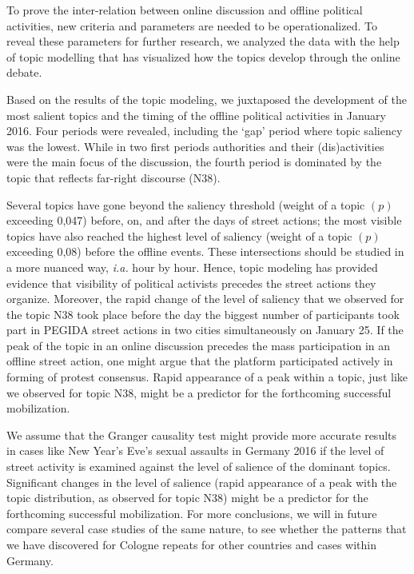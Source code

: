 To prove the inter-relation between online discussion and offline political activities, new criteria and parameters are needed to be operationalized. To reveal these parameters for further research, we analyzed the data with the help of topic modelling that has visualized how the topics develop through the online debate.

Based on the results of the topic modeling, we juxtaposed the development of the most salient topics and the timing of the offline political activities in January 2016. Four periods were revealed, including the ‘gap’ period where topic saliency was the lowest. While in two first periods authorities and their (dis)activities were the main focus of the discussion, the fourth period is dominated by the topic that reflects far-right discourse (N38).

Several topics have gone beyond the saliency threshold (weight of a topic \((p)\) exceeding 0,047) before, on, and after the days of street actions; the most visible topics have also reached the highest level of saliency (weight of a topic \((p)\) exceeding 0,08) before the offline events. These intersections should be studied in a more nuanced way, \textit{i.a.} hour by hour. Hence, topic modeling has provided evidence that visibility of political activists precedes the street actions they organize. Moreover, the rapid change of the level of saliency that we observed for the topic N38 took place before the day the biggest number of participants took part in PEGIDA street actions in two cities simultaneously on January 25. If the peak of the topic in an online discussion precedes the mass participation in an offline street action, one might argue that the platform participated actively in forming of protest consensus. Rapid appearance of a peak within a topic, just like we observed for topic N38, might be a predictor for the forthcoming successful mobilization.

We assume that the Granger causality test might provide more accurate results in cases like New Year’s Eve’s sexual assaults in Germany 2016 if the level of street activity is examined against the level of salience of the dominant topics. Significant changes in the level of salience (rapid appearance of a peak with the topic distribution, as observed for topic N38) might be a predictor for the forthcoming successful mobilization. For more conclusions, we will in future compare several case studies of the same nature, to see whether the patterns that we have discovered for Cologne repeats for other countries and cases within Germany.

